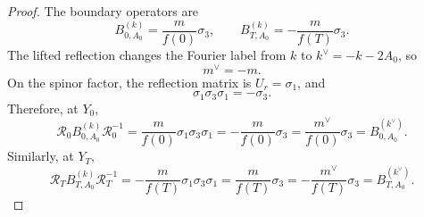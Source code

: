 \documentclass[10pt,a4paper]{amsart}
\begin{document}
\begin{proof}
The boundary operators are
\begin{equation}
B^{(k)}_{0,A_0}
=
\frac{m}{f(0)}\sigma_3,
\qquad
B^{(k)}_{T,A_0}
=
-\frac{m}{f(T)}\sigma_3.
\end{equation}
The lifted reflection changes the Fourier label from \(k\) to \(k^\vee=-k-2A_0\), so
\begin{equation}
m^\vee=-m.
\end{equation}
On the spinor factor, the reflection matrix is \(U_r=\sigma_1\), and
\begin{equation}
\sigma_1\sigma_3\sigma_1=-\sigma_3.
\end{equation}
Therefore, at \(Y_0\),
\begin{equation}
\mathcal R_0 B^{(k)}_{0,A_0}\mathcal R_0^{-1}
=
\frac{m}{f(0)}\sigma_1\sigma_3\sigma_1
=
-\frac{m}{f(0)}\sigma_3
=
\frac{m^\vee}{f(0)}\sigma_3
=
B^{(k^\vee)}_{0,A_0}.
\end{equation}
Similarly, at \(Y_T\),
\begin{equation}
\mathcal R_T B^{(k)}_{T,A_0}\mathcal R_T^{-1}
=
-\frac{m}{f(T)}\sigma_1\sigma_3\sigma_1
=
\frac{m}{f(T)}\sigma_3
=
-\frac{m^\vee}{f(T)}\sigma_3
=
B^{(k^\vee)}_{T,A_0}.
\end{equation}
\end{proof}
\end{document}
